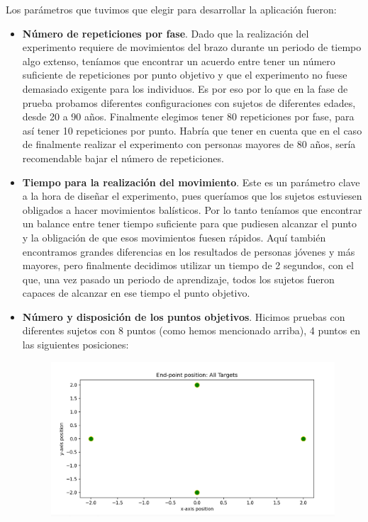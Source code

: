 \documentclass[a4paper,11pt, oneside]{book}
\begin{document}
Los parámetros que tuvimos que elegir para desarrollar la aplicación fueron:
\begin{itemize}
	\item \textbf{Número de repeticiones por fase}. Dado que la realización del experimento requiere de movimientos del brazo durante un periodo de tiempo algo extenso, teníamos que encontrar un acuerdo entre tener un número suficiente de repeticiones por punto objetivo y que el experimento no fuese demasiado exigente para los individuos. Es por eso por lo que en la fase de prueba probamos diferentes configuraciones con sujetos de diferentes edades, desde 20 a 90 años. Finalmente elegimos tener 80 repeticiones por fase, para así tener 10 repeticiones por punto. Habría que tener en cuenta que en el caso de finalmente realizar el experimento con personas mayores de 80 años, sería recomendable bajar el número de repeticiones.
	\item \textbf{Tiempo para la realización del movimiento}. Este es un parámetro clave a la hora de diseñar el experimento, pues queríamos que los sujetos estuviesen obligados a hacer movimientos balísticos. Por lo tanto teníamos que encontrar un balance entre tener tiempo suficiente para que pudiesen alcanzar el punto y la obligación de que esos movimientos fuesen rápidos. Aquí también encontramos grandes diferencias en los resultados de personas jóvenes y más mayores, pero finalmente decidimos utilizar un tiempo de 2 segundos, con el que, una vez pasado un periodo de aprendizaje, todos los sujetos fueron capaces de alcanzar en ese tiempo el punto objetivo.
	\item \textbf{Número y disposición de los puntos objetivos}. Hicimos pruebas con diferentes sujetos con 8 puntos (como hemos mencionado arriba), 4 puntos en las siguientes posiciones:
	
		 \begin{figure}[H]
		
		\centering
		\includegraphics[width=0.5\linewidth]{points-4}
		
		\label{fig:figura1}
		
	\end{figure}
	

\end{itemize}
\end{document}
